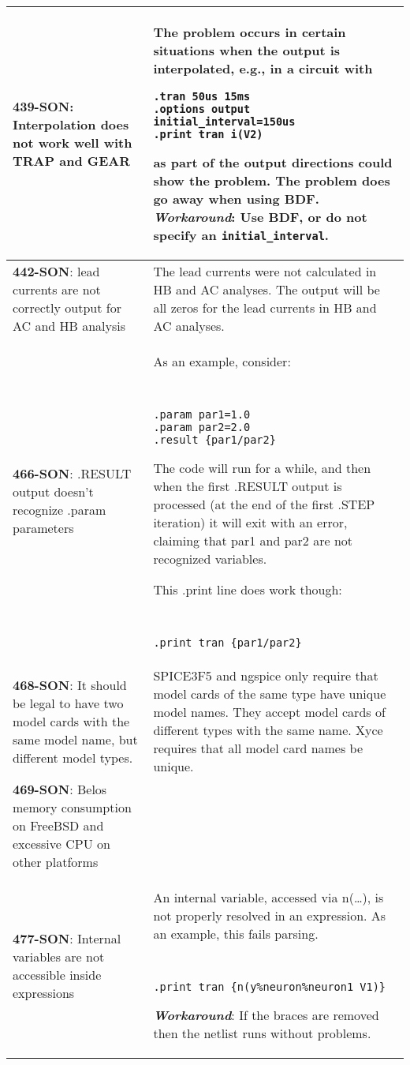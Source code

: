 \begin{longtable}[h] {>{\raggedright\small}m{2in}|>{\raggedright\let\\\tabularnewline\small}m{3.5in}}
\textbf{439-SON}: Interpolation does not work well with TRAP and GEAR &
The problem occurs in certain situations when the output is interpolated, e.g.,
in a circuit with 
\begin{verbatim}
.tran 50us 15ms
.options output initial_interval=150us
.print tran i(V2)
\end{verbatim}
as part of the output directions could show the problem. The problem does
go away when using BDF. 
\textbf{\textit{Workaround}}: Use BDF, or do not specify an
\texttt{initial\_interval}. 
\\ \hline


\textbf{442-SON}: lead currents are not correctly output for AC and HB analysis &

The lead currents were not calculated in HB and AC analyses. The output will be
all zeros for the lead currents in HB and AC analyses.

\\ \hline


\textbf{466-SON}: .RESULT output doesn't recognize .param parameters &  As
an example, consider: 
{\tt
\begin{verbatim}
.param par1=1.0 
.param par2=2.0 
.result {par1/par2} 
\end{verbatim}
}
The code will run for a while, and then when the first .RESULT output is
processed (at the end of the first .STEP iteration) it will exit with an error,
claiming that par1 and par2 are not recognized variables.

This .print line does work though:
{\tt
\begin{verbatim}
.print tran {par1/par2}
\end{verbatim}
}
\\ \hline


\textbf{468-SON}: It should be legal to have two model cards with the same model
name, but different model types. & SPICE3F5 and ngspice only require that
model cards of the same type have unique model names. They accept model cards
of different types with the same name.  Xyce requires that all model card names be unique.
\\ \hline


\textbf{469-SON}: Belos memory consumption on FreeBSD and excessive CPU on other
platforms &
\\ \hline


\textbf{477-SON}: Internal variables are not accessible inside expressions &
An internal variable, accessed via n(…), is not properly resolved in an
expression. As an example, this fails parsing. 
{\tt
\begin{verbatim}
.print tran {n(y%neuron%neuron1_V1)} 
\end{verbatim}
}
\textbf{\textit{Workaround}}: If the braces are removed then the netlist
runs without problems.
\\ \hline


\end{longtable}
